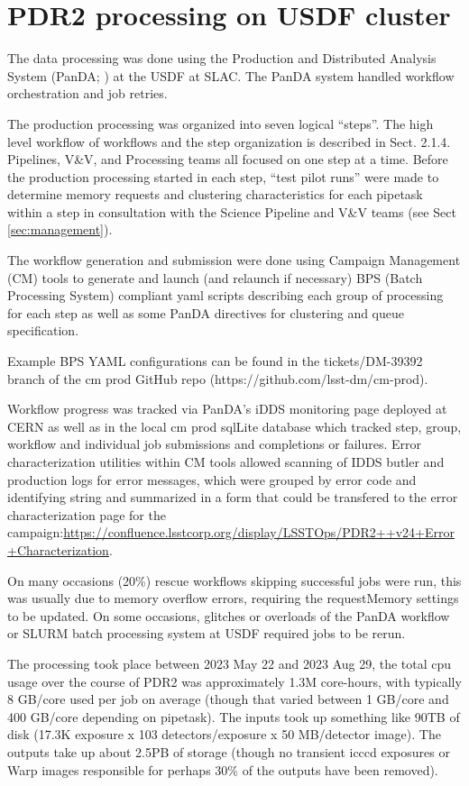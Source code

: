 \section{PDR2 processing on USDF cluster} \label{sec:processing}

The data processing was done using the Production and Distributed Analysis System (PanDA; ) at the USDF at SLAC.
The PanDA system handled workflow orchestration and job retries.

The production processing was organized into seven logical ``steps''.
The high level workflow of workflows and the step organization is described in  Sect. 2.1.4.
Pipelines, V\&V, and Processing teams all focused on one step at a time.
Before the production processing started in each step, ``test pilot runs'' were made to determine memory requests and clustering characteristics for each pipetask within a step in consultation with the Science Pipeline and V\&V teams (see Sect \ref{sec:management}).

The workflow generation and submission were done using Campaign Management (CM) tools to generate and launch (and relaunch if necessary) BPS (Batch Processing System) compliant yaml scripts describing each group of processing for each step as well
as some PanDA directives for clustering and queue specification.  

Example BPS YAML configurations can be found in the tickets/DM-39392 branch of the cm prod GitHub repo (https://github.com/lsst-dm/cm-prod).

Workflow progress was tracked via PanDA's iDDS monitoring page deployed at CERN as well as in the local cm prod sqlLite database which tracked step, group, workflow and individual job submissions and completions or failures. Error characterization
utilities within CM tools allowed scanning of IDDS butler and production logs for error messages, which were grouped by
error code and identifying string and summarized in a form that could be transfered to the error characterization page for
the campaign:\url{https://confluence.lsstcorp.org/display/LSSTOps/PDR2++v24+Error+Characterization}.

On many occasions (20\%) rescue workflows skipping successful jobs were run, this was usually due to memory overflow errors,
requiring the requestMemory settings to be updated.  On some occasions, glitches or overloads of the PanDA workflow or
SLURM batch processing system at USDF required jobs to be rerun.

The processing took place  between 2023 May 22 and 2023 Aug 29, the total cpu usage over the course of PDR2 
was approximately 1.3M core-hours, with typically 8 GB/core used per job on average 
(though that varied between 1 GB/core and 400 GB/core depending on pipetask).
The inputs took up something like 90TB of disk (17.3K exposure x 103 detectors/exposure x 50 MB/detector image).
The outputs take up about 2.5PB of storage (though no transient icccd exposures or Warp images responsible for perhaps 30\% of the outputs have been removed).


